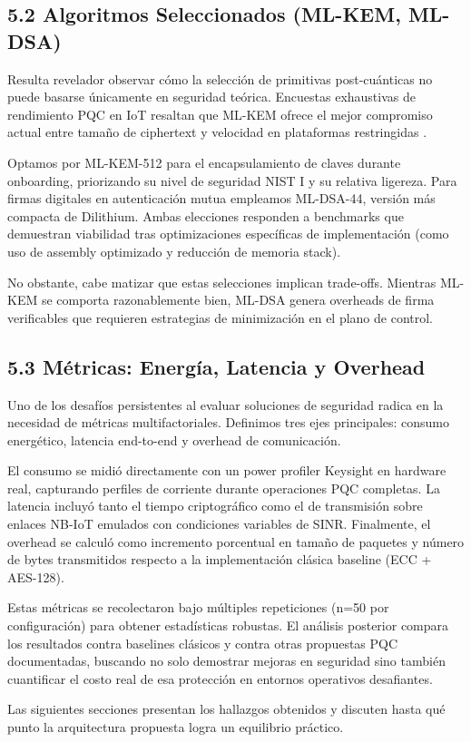 \subsection{5.2 Algoritmos Seleccionados (ML-KEM, ML-DSA)}

Resulta revelador observar cómo la selección de primitivas post-cuánticas no puede basarse únicamente en seguridad teórica. Encuestas exhaustivas de rendimiento PQC en IoT resaltan que ML-KEM ofrece el mejor compromiso actual entre tamaño de ciphertext y velocidad en plataformas restringidas \cite{Liu2024_PQC_IoT}. 

Optamos por ML-KEM-512 para el encapsulamiento de claves durante onboarding, priorizando su nivel de seguridad NIST I y su relativa ligereza. Para firmas digitales en autenticación mutua empleamos ML-DSA-44, versión más compacta de Dilithium. Ambas elecciones responden a benchmarks que demuestran viabilidad tras optimizaciones específicas de implementación (como uso de assembly optimizado y reducción de memoria stack).

No obstante, cabe matizar que estas selecciones implican trade-offs. Mientras ML-KEM se comporta razonablemente bien, ML-DSA genera overheads de firma verificables que requieren estrategias de minimización en el plano de control.

\subsection{5.3 Métricas: Energía, Latencia y Overhead}

Uno de los desafíos persistentes al evaluar soluciones de seguridad radica en la necesidad de métricas multifactoriales. Definimos tres ejes principales: consumo energético, latencia end-to-end y overhead de comunicación.

El consumo se midió directamente con un power profiler Keysight en hardware real, capturando perfiles de corriente durante operaciones PQC completas. La latencia incluyó tanto el tiempo criptográfico como el de transmisión sobre enlaces NB-IoT emulados con condiciones variables de SINR. Finalmente, el overhead se calculó como incremento porcentual en tamaño de paquetes y número de bytes transmitidos respecto a la implementación clásica baseline (ECC + AES-128).

Estas métricas se recolectaron bajo múltiples repeticiones (n=50 por configuración) para obtener estadísticas robustas. El análisis posterior compara los resultados contra baselines clásicos y contra otras propuestas PQC documentadas, buscando no solo demostrar mejoras en seguridad sino también cuantificar el costo real de esa protección en entornos operativos desafiantes.

Las siguientes secciones presentan los hallazgos obtenidos y discuten hasta qué punto la arquitectura propuesta logra un equilibrio práctico.